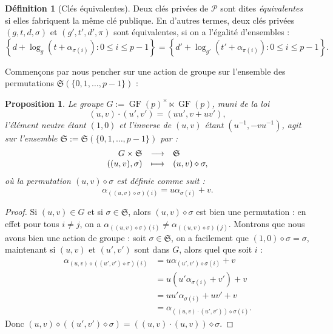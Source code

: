 \documentclass[a4paper, titlepage]{article}
\newtheorem{prop}[theo]{Proposition}
\theoremstyle{definition}
\newtheorem{defi}[theo]{Définition}
\theoremstyle{remark}
\def\gf{\operatorname{GF}}
\begin{document}
\begin{defi}[Clés équivalentes]\label{defiCleEquivalente}
Deux clés privées de $\mathcal{P}$ sont dites \textit{équivalentes} si elles fabriquent la même clé publique. En d'autres termes, deux clés privées $(g,t,d,\sigma)$ et $(g',t',d',\pi)$ sont équivalentes, si on a l'égalité d'ensembles :
$$\left\{d + \log_g(t + \alpha_{\sigma(i)}) : 0\leqslant i \leqslant p-1\right\} = \left\{d' + \log_{g'}(t' + \alpha_{\pi(i)}) : 0\leqslant i \leqslant p-1\right\}.$$
\end{defi}

Commençons par nous pencher sur une action de groupe sur l'ensemble des permutations $\mathfrak{S}(\{0,1,\dots, p-1\})$ :
\begin{prop}
Le groupe $G := \gf(p)^\times\ltimes\gf(p)$, muni de la loi $$(u,v) \cdot (u', v') = (uu', v+uv'),$$ l'élément neutre étant $(1,0)$ et l'inverse de $(u,v)$ étant $(u^{-1}, -vu^{-1})$, agit sur l'ensemble $\mathfrak{S} := \mathfrak{S}(\{0,1,\dots, p-1\})$ par :
$$\begin{array}{r c l}
G \times \mathfrak{S}& \longrightarrow& \mathfrak{S} \\
((u, v), \sigma) & \longmapsto& (u, v)\diamond\sigma,
\end{array}$$ 
où la permutation $(u, v)\diamond\sigma$ est définie comme suit :
$$\alpha_{((u, v)\diamond\sigma)(i)} = u\alpha_{\sigma(i)} +v.$$ 
\end{prop}

\begin{proof}
Si $(u, v) \in G$ et si $\sigma \in \mathfrak{S}$, alors $(u, v)\diamond\sigma$ est bien une permutation : en effet pour tous $i \neq j$, on a $\alpha_{((u, v)\diamond\sigma)(i)} \neq \alpha_{((u, v)\diamond\sigma)(j)}$.
Montrons que nous avons bien une action de groupe : soit $\sigma \in \mathfrak{S}$, on a facilement que $(1, 0)\diamond\sigma = \sigma$, maintenant si $(u, v)$ et $(u', v')$ sont dans $G$, alors quel que soit $i$ :
\begin{align*}
\alpha_{(u, v)\diamond((u', v')\diamond\sigma)(i)} &= u\alpha_{(u', v')\diamond\sigma(i)} +v\\
&= u\left(u'\alpha_{\sigma(i)} +v'\right) +v\\
&= uu'\alpha_{\sigma(i)} +uv'+v\\
&= \alpha_{((u, v)\cdot(u', v'))\diamond\sigma(i)}.
\end{align*}
Donc $(u, v)\diamond((u', v')\diamond\sigma) = ((u, v)\cdot(u, v))\diamond\sigma$.
\end{proof}
\end{document}
